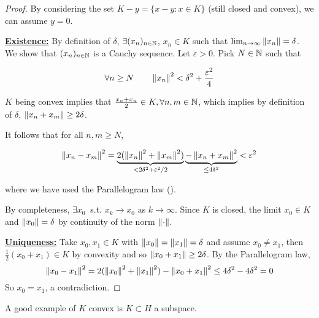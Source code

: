 \documentclass{article}
\begin{document}
\begin{proof}
	By considering the set $K-y = \{x-y: x\in K\}$ (still closed and convex), we can assume $y=0$.

	\underline{\textbf{Existence:}}\nl
	By definition of $\delta$, $\exists (x_n)_{n \in \mathbb{N}}$, $x_n\in K$ such that $\lim_{n \to \infty} \left\|{x_n}\right\|=\delta$. We show that $(x_n)_{n \in \mathbb{N}}$ is a Cauchy sequence. Let $\varepsilon >0$. Pick $N \in \mathbb{N}$ such that

	$$
		\forall n \geq N \qquad \left\|{x_n}\right\|^2 < \delta^2 + \frac{\varepsilon^2}{4}
	$$

	$K$ being convex implies that $\frac{x_n+x_n}{2} \in K, \forall n,m \in \mathbb{N}$, which implies by definition of $\delta$, $\left\|{x_n+x_m}\right\| \geq 2\delta$.

	It follows that for all $n,m \geq N$,

	\begin{equation*}
		\left\|{x_n-x_m}\right\|^2 = \underbrace{2(\left\|{x_n}\right\|^2+\left\|{x_m}\right\|^2)}_{< 2\delta^2 + \varepsilon^2 /2} \underbrace{-\left\|{x_n+x_m}\right\|^2}_{\leq 4\delta^2} < \varepsilon^2
	\end{equation*}

	where we have used the Parallelogram law ().

	By completeness, $\exists x_0 \ $ s.t. $x_k \to x_0$ as $k \to \infty$. Since $K$ is closed, the limit $x_0\in K$ and $\left\|{x_0}\right\|=\delta$ by continuity of the norm $\left\|{\cdot}\right\|$.

	\underline{\textbf{Uniqueness:}}\nl
	Take $x_0, x_1 \in K$ with $\left\|{x_0}\right\|=\left\|{x_1}\right\|=\delta$ and assume $x_0\neq x_1$, then $\frac{1}{2}(x_0+x_1) \in K$ by convexity and so $\left\|{x_0+x_1}\right\|\geq 2\delta$. By the Parallelogram law,
	$$
		\left\|{x_0-x_1}\right\|^2 = 2(\left\|{x_0}\right\|^2 + \left\|{x_1}\right\|^2) - \left\|{x_0+x_1}\right\|^2 \leq 4\delta^2-4\delta^2= 0
	$$
	So $x_0=x_1$, a contradiction.
\end{proof}

\begin{remark}
	A good example of $K$ convex is $K \subset H$ a subspace.
\end{remark}
\end{document}
